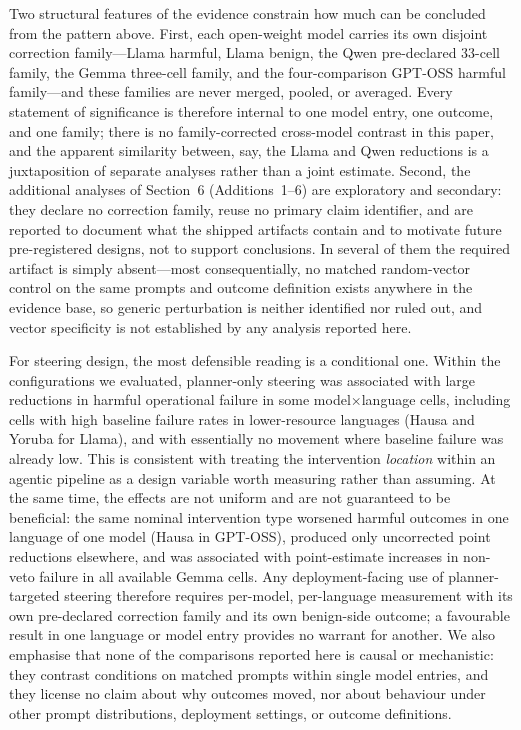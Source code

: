 Two structural features of the evidence constrain how much can be concluded from
the pattern above. First, each open-weight model carries its own disjoint
correction family---Llama harmful, Llama benign, the Qwen pre-declared 33-cell
family, the Gemma three-cell family, and the four-comparison GPT-OSS harmful
family---and these families are never merged, pooled, or averaged. Every
statement of significance is therefore internal to one model entry, one outcome,
and one family; there is no family-corrected cross-model contrast in this paper,
and the apparent similarity between, say, the Llama and Qwen reductions is a
juxtaposition of separate analyses rather than a joint estimate. Second, the
additional analyses of Section~6 (Additions~1--6) are exploratory and secondary:
they declare no correction family, reuse no primary claim identifier, and are
reported to document what the shipped artifacts contain and to motivate future
pre-registered designs, not to support conclusions. In several of them the
required artifact is simply absent---most consequentially, no matched
random-vector control on the same prompts and outcome definition exists anywhere
in the evidence base, so generic perturbation is neither identified nor ruled
out, and vector specificity is not established by any analysis reported here.

For steering design, the most defensible reading is a conditional one. Within the
configurations we evaluated, planner-only steering was associated with large
reductions in harmful operational failure in some model$\times$language cells,
including cells with high baseline failure rates in lower-resource languages
(Hausa and Yoruba for Llama), and with essentially no movement where baseline
failure was already low. This is consistent with treating the intervention
\emph{location} within an agentic pipeline as a design variable worth measuring
rather than assuming. At the same time, the effects are not uniform and are not
guaranteed to be beneficial: the same nominal intervention type worsened harmful
outcomes in one language of one model (Hausa in GPT-OSS), produced only
uncorrected point reductions elsewhere, and was associated with point-estimate
increases in non-veto failure in all available Gemma cells. Any deployment-facing
use of planner-targeted steering therefore requires per-model, per-language
measurement with its own pre-declared correction family and its own benign-side
outcome; a favourable result in one language or model entry provides no warrant
for another. We also emphasise that none of the comparisons reported here is
causal or mechanistic: they contrast conditions on matched prompts within single
model entries, and they license no claim about why outcomes moved, nor about
behaviour under other prompt distributions, deployment settings, or outcome
definitions.

